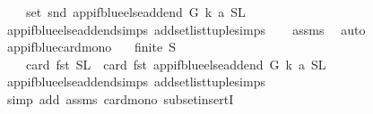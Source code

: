 \begin{isabellebody}
\ \ \ {\isasymsubseteq}\ set\ {\isacharparenleft}{\kern0pt}snd\ {\isacharparenleft}{\kern0pt}app{\isacharunderscore}{\kern0pt}if{\isacharunderscore}{\kern0pt}blue{\isacharunderscore}{\kern0pt}else{\isacharunderscore}{\kern0pt}add{\isacharunderscore}{\kern0pt}end\ G\ k\ a\ {\isacharparenleft}{\kern0pt}S{}{\isacharcomma}{\kern0pt}L{}{\isacharparenright}{\kern0pt}{\isacharparenright}{\kern0pt}{\isacharparenright}{\kern0pt}{\isachardoublequoteclose}\isanewline
%
\isadelimproof
\ \ %
\endisadelimproof
%
\isatagproof
{}\isamarkupfalse%
\ app{\isacharunderscore}{\kern0pt}if{\isacharunderscore}{\kern0pt}blue{\isacharunderscore}{\kern0pt}else{\isacharunderscore}{\kern0pt}add{\isacharunderscore}{\kern0pt}end{\isachardot}{\kern0pt}simps\ add{\isacharunderscore}{\kern0pt}set{\isacharunderscore}{\kern0pt}list{\isacharunderscore}{\kern0pt}tuple{\isachardot}{\kern0pt}simps\isanewline
\ \ \isamarkupfalse%
\ assms\ \isamarkupfalse%
\ auto%
\endisatagproof
{\isafoldproof}%
%
\isadelimproof
\isanewline
%
\endisadelimproof
\ \isanewline
\isanewline
{}\isamarkupfalse%
\ app{\isacharunderscore}{\kern0pt}if{\isacharunderscore}{\kern0pt}blue{\isacharunderscore}{\kern0pt}card{\isacharunderscore}{\kern0pt}mono{\isacharcolon}{\kern0pt}\isanewline
\ \ \ {\isachardoublequoteopen}finite\ S{\isachardoublequoteclose}\isanewline
\ \ \ \ {\isachardoublequoteopen}card\ {\isacharparenleft}{\kern0pt}fst\ {\isacharparenleft}{\kern0pt}S{\isacharcomma}{\kern0pt}L{\isacharparenright}{\kern0pt}{\isacharparenright}{\kern0pt}\ {\isasymle}\ card\ {\isacharparenleft}{\kern0pt}fst\ {\isacharparenleft}{\kern0pt}app{\isacharunderscore}{\kern0pt}if{\isacharunderscore}{\kern0pt}blue{\isacharunderscore}{\kern0pt}else{\isacharunderscore}{\kern0pt}add{\isacharunderscore}{\kern0pt}end\ G\ k\ a\ {\isacharparenleft}{\kern0pt}S{\isacharcomma}{\kern0pt}L{\isacharparenright}{\kern0pt}{\isacharparenright}{\kern0pt}{\isacharparenright}{\kern0pt}{\isachardoublequoteclose}\isanewline
%
\isadelimproof
\ \ %
\endisadelimproof
%
\isatagproof
{}\isamarkupfalse%
\ app{\isacharunderscore}{\kern0pt}if{\isacharunderscore}{\kern0pt}blue{\isacharunderscore}{\kern0pt}else{\isacharunderscore}{\kern0pt}add{\isacharunderscore}{\kern0pt}end{\isachardot}{\kern0pt}simps\ add{\isacharunderscore}{\kern0pt}set{\isacharunderscore}{\kern0pt}list{\isacharunderscore}{\kern0pt}tuple{\isachardot}{\kern0pt}simps\isanewline
\ \ \isamarkupfalse%
\ {\isacharparenleft}{\kern0pt}simp\ add{\isacharcolon}{\kern0pt}\ assms\ card{\isacharunderscore}{\kern0pt}mono\ subset{\isacharunderscore}{\kern0pt}insertI{\isacharparenright}{\kern0pt}%

\end{isabellebody}
